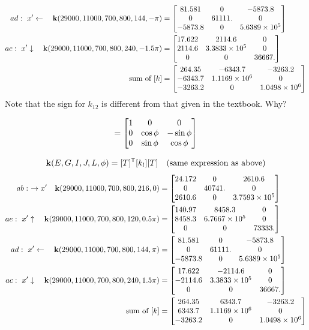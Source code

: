 \begin{enumerate}[leftmargin=*]
\begin{align*}
      ad:\ x'\leftarrow\quad \mathbf{k}(29000, 11000, 700, 800, 144, -\pi) &= \begin{bmatrix}81.581 & 0 & -5873.8\\ 0 & 61111. & 0\\ -5873.8 & 0 & 5.6389\times10^5\end{bmatrix}\\
      ac:\ x'\downarrow\quad \mathbf{k}(29000, 11000, 700, 800, 240, -1.5\pi) &= \begin{bmatrix}17.622 & 2114.6 & 0\\ 2114.6 & 3.3833\times10^5 & 0\\ 0 & 0 & 36667.\end{bmatrix}\\
      \text{sum of }[k] &= \begin{bmatrix}264.35 & -6343.7 & -3263.2\\ -6343.7 & 1.1169\times10^6 & 0\\ -3263.2 & 0 & 1.0498\times10^6\end{bmatrix}
    \end{align*}
    Note that the sign for $k_{12}$ is different from that given in the textbook. Why?

    \begin{minipage}{0.5\linewidth}
      \begin{equation*}
        [T] = \bmat{1 & 0 & 0\\ 0 & \cos\phi & -\sin\phi\\ 0 & \sin\phi & \cos\phi}
      \end{equation*}
    \end{minipage}\hfill
    \begin{minipage}{0.4\linewidth}\centering
      
    \end{minipage}
    \begin{equation*}
      \mathbf{k}(E,G,I,J,L,\phi) = [T]^{\mathsf{T}}[k_l][T] \quad\text{(same expression as above)}
    \end{equation*}
    \begin{align*}
      ab:\ \rightarrow x'\quad \mathbf{k}(29000, 11000, 700, 800, 216, 0) &= \begin{bmatrix}24.172 & 0 & 2610.6\\ 0 & 40741. & 0\\ 2610.6 & 0 & 3.7593\times10^5\end{bmatrix}\\
      ae:\ x'\uparrow\quad \mathbf{k}(29000, 11000, 700, 800, 120, 0.5\pi) &= \begin{bmatrix}140.97 & 8458.3 & 0\\ 8458.3 & 6.7667\times10^5 & 0\\ 0 & 0 & 73333.\end{bmatrix}\\
      ad:\ x'\leftarrow\quad \mathbf{k}(29000, 11000, 700, 800, 144, \pi) &= \begin{bmatrix}81.581 & 0 & -5873.8\\ 0 & 61111. & 0\\ -5873.8 & 0 & 5.6389\times10^5\end{bmatrix}\\
      ac:\ x'\downarrow\quad \mathbf{k}(29000, 11000, 700, 800, 240, 1.5\pi) &= \begin{bmatrix}17.622 & -2114.6 & 0\\ -2114.6 & 3.3833\times10^5 & 0\\ 0 & 0 & 36667.\end{bmatrix}\\
      \text{sum of }[k] &= \begin{bmatrix}264.35 & 6343.7 & -3263.2\\ 6343.7 & 1.1169\times10^6 & 0\\ -3263.2 & 0 & 1.0498\times10^6\end{bmatrix}
    \end{align*}


\end{enumerate}
